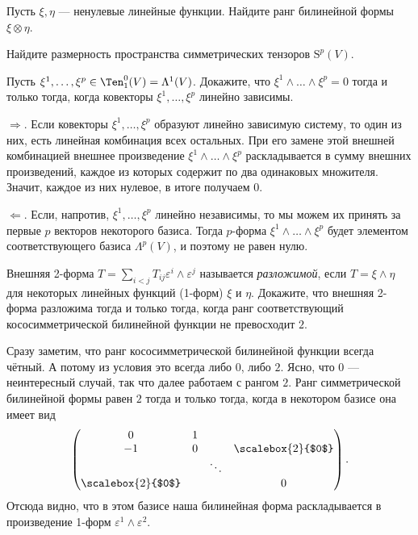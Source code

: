 \begin{problem}
    Пусть $\xi, \eta$ --- ненулевые линейные функции. Найдите ранг билинейной формы $\xi \otimes \eta$.
\end{problem}

\begin{problem}
    Найдите размерность пространства симметрических тензоров $\mathrm{S}^p(V)$.
\end{problem}

\begin{problem}
    Пусть $\xi^1, \ldots, \xi^p \in \Ten_1^0(V) = \Lambda^1(V)$. Докажите, что $\xi^1 \wedge \ldots \wedge \xi^p = 0$ тогда и только тогда, когда ковекторы $\xi^1, \ldots, \xi^p$ линейно зависимы.
\end{problem}

\begin{solution}
    $\Rightarrow$. Если ковекторы $\xi^1, \ldots, \xi^p$ образуют линейно зависимую систему, то один из них, есть линейная комбинация всех остальных. При его замене этой внешней комбинацией внешнее произведение $\xi^1 \wedge \ldots \wedge \xi^p$ раскладывается в сумму внешних произведений, каждое из которых содержит по два одинаковых множителя. Значит, каждое из них нулевое, в итоге получаем $0$.

    $\Leftarrow$. Если, напротив, $\xi^1, \ldots, \xi^p$ линейно независимы, то мы можем их принять за первые $p$ векторов некоторого базиса. Тогда $p$-форма $\xi^1 \wedge \ldots \wedge \xi^p$ будет элементом соответствующего базиса $\Lambda^p(V)$, и поэтому не равен нулю.
\end{solution}

\begin{problem}
    Внешняя 2-форма $T = \sum\limits_{i < j}T_{ij}\varepsilon^i \wedge \varepsilon^j$ называется \textit{разложимой}, если $T = \xi \wedge \eta$ для некоторых линейных функций (1-форм) $\xi$ и $\eta$. Докажите, что внешняя 2-форма разложима тогда и только тогда, когда ранг соответствующий кососимметрической билинейной функции не превосходит $2$.
\end{problem}

\begin{solution}
    Сразу заметим, что ранг кососимметрической билинейной функции всегда чётный. А потому из условия это всегда либо $0$, либо $2$. Ясно, что $0$ --- неинтересный случай, так что далее работаем с рангом $2$. Ранг симметрической билинейной формы равен $2$ тогда и только тогда, когда в некотором базисе она имеет вид
    \[
        \begin{pmatrix}
            0 & 1 & & \\
            -1 & 0 & & \scalebox{2}{$0$} \\
             & & \ddots & \\
             \scalebox{2}{$0$} & & & 0
        \end{pmatrix}.
    \]
    Отсюда видно, что в этом базисе наша билинейная форма раскладывается в произведение 1-форм $\varepsilon^1 \wedge \varepsilon^2$.
\end{solution}

